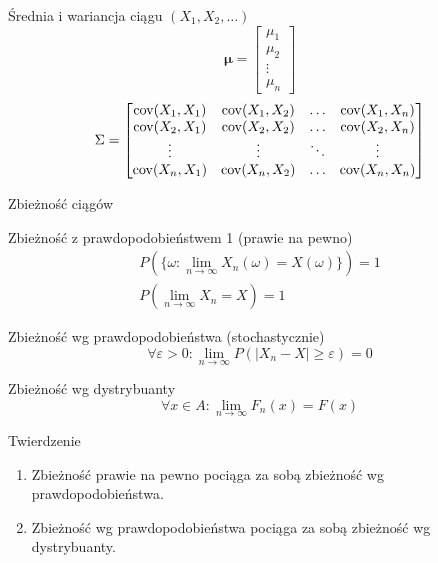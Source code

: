 \documentclass{mp}
\subtitle{Ciągi zmiennych losowych}
\begin{document}
\frame{\titlepage}
\begin{frame}{Średnia i wariancja ciągu $(X_1,X_2,\ldots)$}
\[ \bm{\mu}=\begin{bmatrix} \mu_1 \\ \mu_2 \\ \vdots \\ \mu_n \end{bmatrix} \]
\[ \Sigma=\begin{bmatrix}
\operatorname{cov}(X_1,X_1) & \operatorname{cov}(X_1,X_2) & \ldots & \operatorname{cov}(X_1,X_n) \\
\operatorname{cov}(X_2,X_1) & \operatorname{cov}(X_2,X_2) & \ldots & \operatorname{cov}(X_2,X_n) \\
\vdots & \vdots & \ddots & \vdots \\
\operatorname{cov}(X_n,X_1) & \operatorname{cov}(X_n,X_2) & \ldots & \operatorname{cov}(X_n,X_n) \\
\end{bmatrix} \]
\end{frame}
\begin{frame}{Zbieżność ciągów}
\only<+>
{
\begin{block}{Zbieżność z prawdopodobieństwem 1 (prawie na pewno)}
\begin{gather*}
P(\{\omega\colon \lim_{n\to\infty}X_n(\omega)=X(\omega)\})=1 \\
P(\lim_{n\to\infty} X_n=X)=1
\end{gather*}
\end{block}
}
\only<+>
{
\begin{block}{Zbieżność wg prawdopodobieństwa (stochastycznie)}
\[\forall\varepsilon>0\colon \lim_{n\to\infty}P(\left|X_n-X\right|\geq\varepsilon)=0\]
\end{block}
}
\only<+>
{
\begin{block}{Zbieżność wg dystrybuanty}
\[\forall x\in A\colon \lim_{n\to\infty} F_n(x) =F(x) \]
\end{block}
}
\only<+>
{
	\begin{block}{Twierdzenie}
	\begin{enumerate}
	\item Zbieżność prawie na pewno pociąga za sobą zbieżność wg prawdopodobieństwa.
	\item Zbieżność wg prawdopodobieństwa pociąga za sobą zbieżność wg dystrybuanty.
	\end{enumerate}
	\end{block}
}
\end{frame}
\end{document}
